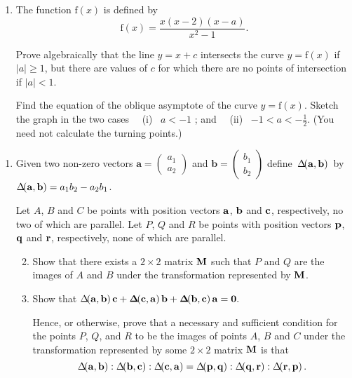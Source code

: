 \documentclass[a4, 11pt]{report}
\newlength{\qspace}
\newcounter{qnumber}
\newenvironment{question}%
 {\vspace{\qspace}
  \begin{enumerate}[\bfseries 1\quad][10]%
    \setcounter{enumi}{\value{qnumber}}%
    \item%
 }
{
  \end{enumerate}
  \filbreak
  \stepcounter{qnumber}
 }
\newenvironment{questionparts}[1][1]%
 {
  \begin{enumerate}[\bfseries (i)]%
    \setcounter{enumii}{#1}
    \addtocounter{enumii}{-1}
    \setlength{\itemsep}{5mm}
    \setlength{\parskip}{8pt}
 }
 {
  \end{enumerate}
 }
\def\f{{\mathrm f}}
\def\ge{\geqslant}
\begin{document}
\begin{question}
The function $\f(x)$ is defined by     
$$ 
\f(x) = \frac{x( x - 2 )(x-a)}{  x^2 - 1}. 
$$ 
 
 
Prove algebraically that the line $y = x + c$  
intersects the curve  $y = \f ( x )$ 
if  $\vert a \vert \ge1$, but there are values of $c$ 
for which there are no points of intersection if $\vert a \vert <1$. 
 
Find the equation of the oblique asymptote of the curve $y=\f(x)$. 
Sketch the graph in the two cases 
 \ \ (i) \ $a<-1$ ; and \ \ (ii) \ $-1<a<-\frac12$.  
(You need not calculate the turning points.)

\end{question}

\begin{question}
Given two non-zero vectors  
$\mathbf{a}=\begin{pmatrix}a_{1}\\
a_{2}
\end{pmatrix}$ and $\mathbf{b}=\begin{pmatrix}b_{1}\\
b_{2}
\end{pmatrix}$
\mbox{define  $\Delta\!\! \left( \bf a, \bf b \right)$ by 
 $\Delta\!\! \left( \bf a, \bf b \right) = a_1 b_2 - a_2 b_1$.} 
 
 
Let $A$, $B$ and $C$ be  points with position vectors $\bf a$, $\bf b$ and $\bf c$,  
respectively, no two of which are parallel. Let   $P$, $Q$ and $R$ be points with position 
vectors $\bf p$, $\bf q$ and $\bf r$, respectively, none of which are parallel. 
 
\begin{questionparts} 
\item
Show 
that there exists a $2 \times 2$ matrix $\bf M$ such that 
$P$ and  $Q$ 
are the images of $A$ and  $B$   
under the transformation represented by $\bf M$. 
  
\item
Show that 
$ 
\Delta\!\! \left( \bf a, \bf b \right) \bf c  
+ \Delta\!\! \left( \bf c, \bf a \right) \bf b  
+ \Delta\!\! \left( \bf b, \bf c \right) \bf a = 0.  
$ 
 
Hence, or otherwise, prove that a necessary and sufficient condition for the points  
$P$, $Q$, and $R$ 
to be the images of points $A$, $B$ and  $C$  
under the transformation represented by some $2 \times 2$ matrix $\bf M$ is that 
\[ 
\Delta\!\! \left( \bf a, \bf b \right) :  
\Delta\!\! \left( \bf b, \bf c \right) :  
\Delta\!\! \left( \bf c, \bf a \right) =  
\Delta\!\! \left( \bf p, \bf q \right) :  
\Delta\!\! \left( \bf q, \bf r \right) :   
\Delta\!\! \left( \bf r, \bf p \right). 
\] 
\end{questionparts} 

	\end{question}
	
\end{document}
